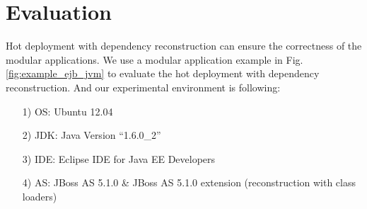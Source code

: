 \documentclass[conference]{IEEEtran}
\begin{document}


\section{Evaluation\label{sec:evaluation}}

Hot deployment with dependency reconstruction can ensure the correctness of the modular applications.
We use a modular application example in Fig. \ref{fig:example_ejb_jvm} to evaluate the hot deployment with dependency reconstruction.
And our experimental environment is following:
\begin{itemize}[]
\item[1)] OS: Ubuntu 12.04
\item[2)] JDK: Java Version ``1.6.0\_2''
\item[3)] IDE: Eclipse IDE for Java EE Developers
\item[4)] AS: JBoss AS 5.1.0 \& JBoss AS 5.1.0 extension (reconstruction with class loaders)
\end{itemize}

\end{document}
